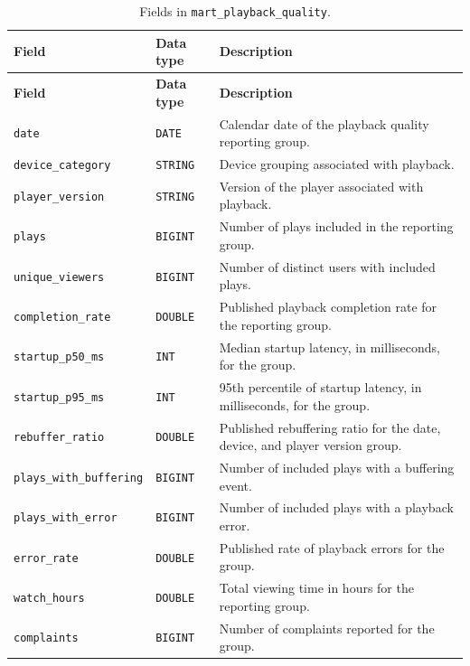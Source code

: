\documentclass[a4paper,12pt]{article}
\newcommand{\dbsep}{\_\allowbreak}
\begin{document}
\begingroup
\small
\setlength{\tabcolsep}{4pt}
\renewcommand{\arraystretch}{1.1}
\begin{longtable}{@{}>{\raggedright\arraybackslash}p{}
                    >{\raggedright\arraybackslash}p{}
                    >{\raggedright\arraybackslash}p{}@{}}
\caption{Fields in \texttt{mart\dbsep playback\dbsep quality}.}\\
\toprule
\textbf{Field} & \textbf{Data type} & \textbf{Description}\\
\midrule
\endfirsthead
\toprule
\textbf{Field} & \textbf{Data type} & \textbf{Description}\\
\midrule
\endhead
\bottomrule
\endfoot
\texttt{date} & \texttt{DATE} & Calendar date of the playback quality reporting group.\\
\texttt{device\dbsep category} & \texttt{STRING} & Device grouping associated with playback.\\
\texttt{player\dbsep version} & \texttt{STRING} & Version of the player associated with playback.\\
\texttt{plays} & \texttt{BIGINT} & Number of plays included in the reporting group.\\
\texttt{unique\dbsep viewers} & \texttt{BIGINT} & Number of distinct users with included plays.\\
\texttt{completion\dbsep rate} & \texttt{DOUBLE} & Published playback completion rate for the reporting group.\\
\texttt{startup\dbsep p50\dbsep ms} & \texttt{INT} & Median startup latency, in milliseconds, for the group.\\
\texttt{startup\dbsep p95\dbsep ms} & \texttt{INT} & 95th percentile of startup latency, in milliseconds, for the group.\\
\texttt{rebuffer\dbsep ratio} & \texttt{DOUBLE} & Published rebuffering ratio for the date, device, and player version group.\\
\texttt{plays\dbsep with\dbsep buffering} & \texttt{BIGINT} & Number of included plays with a buffering event.\\
\texttt{plays\dbsep with\dbsep error} & \texttt{BIGINT} & Number of included plays with a playback error.\\
\texttt{error\dbsep rate} & \texttt{DOUBLE} & Published rate of playback errors for the group.\\
\texttt{watch\dbsep hours} & \texttt{DOUBLE} & Total viewing time in hours for the reporting group.\\
\texttt{complaints} & \texttt{BIGINT} & Number of complaints reported for the group.\\
\end{longtable}
\endgroup
\end{document}
